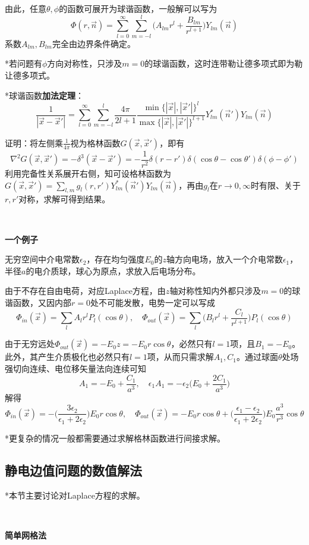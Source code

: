 \documentclass[a4paper,UTF8,fontset=windows]{ctexart}
\newcommand*{\vns}{\vec{n}}
\newcommand*{\vx}{\vec{x}}
\begin{document}
由此，任意$\theta,\phi$的函数可展开为球谐函数，一般解可以写为
$$\Phi(r,\vns)=\sum_{l=0}^\infty\sum_{m=-l}^l\bigg(A_{lm}r^l+\frac{B_{lm}}{r^{l+1}}\bigg)Y_{lm}(\vns)$$
系数$A_{lm},B_{lm}$完全由边界条件确定。

*若问题有$\phi$方向对称性，只涉及$m=0$的球谐函数，这时连带勒让德多项式即为勒让德多项式。

*球谐函数\textbf{加法定理}：
$$\frac{1}{|\vx-\vx'|}=\sum_{l=0}^\infty\sum_{m=-l}^l\frac{4\pi}{2l+1}\frac{\min\{|\vx|,|\vx'|\}^l}{\max\{|\vx|,|\vx'|\}^{l+1}}Y_{lm}^*(\vns')Y_{lm}(\vns)$$

证明：将左侧乘$\frac{1}{4\pi}$视为格林函数$G(\vx,\vx')$，即有
$$\nabla^2G(\vx,\vx')=-\delta^3(\vx-\vx')=-\frac{1}{r^2}\delta(r-r')\delta(\cos\theta-\cos\theta')\delta(\phi-\phi')$$
利用完备性关系展开右侧，知可设格林函数为$G(\vx,\vx')=\sum_{l,m}g_l(r,r')Y_{lm}^*(\vns')Y_{lm}(\vns)$，再由$g_l$在$r\to0,\infty$时有限、关于$r,r'$对称，求解可得到结果。

\

\textbf{一个例子}

无穷空间中介电常数$\epsilon_2$，存在均匀强度$E_0$的$z$轴方向电场，放入一个介电常数$\epsilon_1$，半径$a$的电介质球，球心为原点，求放入后电场分布。

由于不存在自由电荷，对应Laplace方程，由$z$轴对称性知内外都只涉及$m=0$的球谐函数，又因内部$r=0$处不可能发散，电势一定可以写成
$$\Phi_{in}(\vx)=\sum_lA_lr^lP_l(\cos\theta),\quad\Phi_{out}(\vx)=\sum_l\bigg(B_lr^l+\frac{C_l}{r^{l+1}}\bigg)P_l(\cos\theta)$$

由于无穷远处$\Phi_{out}(\vx)=-E_0z=-E_0r\cos\theta$，必然只有$l=1$项，且$B_1=-E_0$。此外，其产生介质极化也必然只有$l=1$项，从而只需求解$A_1,C_1$。通过球面$\theta$处场强切向连续、电位移矢量法向连续可知
$$A_1=-E_0+\frac{C_1}{a^3},\quad\epsilon_1A_1=-\epsilon_2\bigg(E_0+\frac{2C_1}{a^3}\bigg)$$
解得
$$\Phi_{in}(\vx)=-\bigg(\frac{3\epsilon_2}{\epsilon_1+2\epsilon_2}\bigg)E_0r\cos\theta,\quad\Phi_{out}(\vx)=-E_0r\cos\theta+\bigg(\frac{\epsilon_1-\epsilon_2}{\epsilon_1+2\epsilon_2}\bigg)E_0\frac{a^3}{r^3}\cos\theta$$

*更复杂的情况一般都需要通过求解格林函数进行间接求解。

\subsection{静电边值问题的数值解法}
*本节主要讨论对Laplace方程的求解。

\

\textbf{简单网格法}
\end{document}
